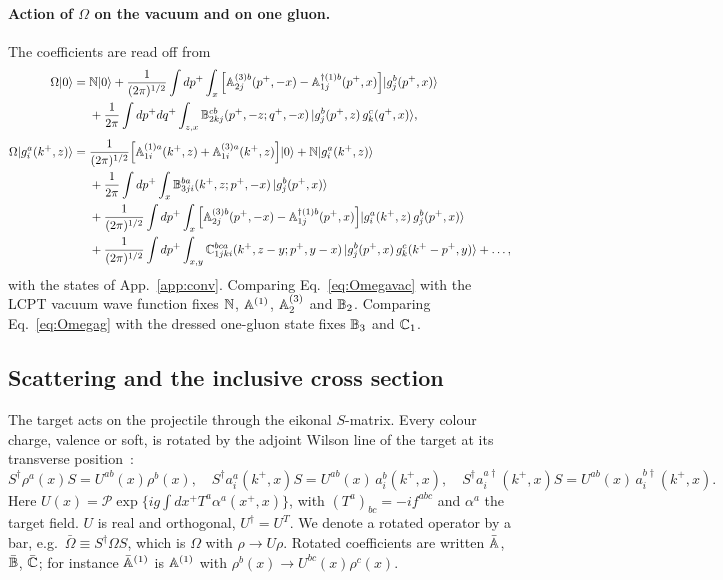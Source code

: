 \paragraph*{Action of $\Omega$ on the vacuum and on one gluon.} The coefficients are read off from
\begin{align}
\Omega|0\rangle={}&\mathbb{N}|0\rangle+\frac{1}{(2\pi)^{1/2}}\int dp^+\int_x\Big[\mathbb{A}^{(3)b}_{2j}(p^+,-x)-\mathbb{A}^{\dagger(1)b}_{1j}(p^+,x)\Big]|g^b_j(p^+,x)\rangle\notag\\
&+\frac{1}{2\pi}\int dp^+dq^+\int_{z,x}\mathbb{B}^{cb}_{2kj}(p^+,-z;q^+,-x)\,|g^b_j(p^+,z)\,g^c_k(q^+,x)\rangle,\label{eq:Omegavac}\\[3pt]
\Omega|g^a_i(k^+,z)\rangle={}&\frac{1}{(2\pi)^{1/2}}\Big[\mathbb{A}^{(1)a}_{1i}(k^+,z)+\mathbb{A}^{(3)a}_{1i}(k^+,z)\Big]|0\rangle+\mathbb{N}|g^a_i(k^+,z)\rangle\notag\\
&+\frac{1}{2\pi}\int dp^+\int_x\mathbb{B}^{ba}_{3ji}(k^+,z;p^+,-x)\,|g^b_j(p^+,x)\rangle\notag\\
&+\frac{1}{(2\pi)^{1/2}}\int dp^+\int_x\Big[\mathbb{A}^{(3)b}_{2j}(p^+,-x)-\mathbb{A}^{\dagger(1)b}_{1j}(p^+,x)\Big]|g^a_i(k^+,z)\,g^b_j(p^+,x)\rangle\notag\\
&+\frac{1}{(2\pi)^{1/2}}\int dp^+\int_{x,y}\mathbb{C}^{bca}_{1jki}(k^+,z-y;p^+,y-x)\,|g^b_j(p^+,x)\,g^c_k(k^+-p^+,y)\rangle+\dots,\label{eq:Omegag}
\end{align}
with the states of App.~\ref{app:conv}. Comparing Eq.~\eqref{eq:Omegavac} with the LCPT vacuum wave function fixes $\mathbb{N}$, $\mathbb{A}^{(1)}$, $\mathbb{A}^{(3)}_2$ and $\mathbb{B}_2$. Comparing Eq.~\eqref{eq:Omegag} with the dressed one-gluon state fixes $\mathbb{B}_3$ and $\mathbb{C}_1$.

\subsection{Scattering and the inclusive cross section}\label{sec:xsecdef}

The target acts on the projectile through the eikonal $S$-matrix. Every colour charge, valence or soft, is rotated by the adjoint Wilson line of the target at its transverse position~\cite{Kovner:2005nq}:
\begin{equation}
S^\dagger\rho^a(x)S=U^{ab}(x)\rho^b(x),\quad S^\dagger a^a_i(k^+,x)S=U^{ab}(x)\,a^b_i(k^+,x),\quad S^\dagger a^{a\dagger}_i(k^+,x)S=U^{ab}(x)\,a^{b\dagger}_i(k^+,x).
\label{eq:Srot}
\end{equation}
Here $U(x)=\mathcal P\exp\{ig\int dx^+T^a\alpha^a(x^+,x)\}$, with $(T^a)_{bc}=-if^{abc}$ and $\alpha^a$ the target field. $U$ is real and orthogonal, $U^\dagger=U^T$. We denote a rotated operator by a bar, e.g.\ $\bar\Omega\equiv S^\dagger\Omega S$, which is $\Omega$ with $\rho\to U\rho$. Rotated coefficients are written $\bar{\mathbb{A}}$, $\bar{\mathbb{B}}$, $\bar{\mathbb{C}}$; for instance $\bar{\mathbb{A}}^{(1)}$ is $\mathbb{A}^{(1)}$ with $\rho^b(x)\to U^{bc}(x)\rho^c(x)$.

